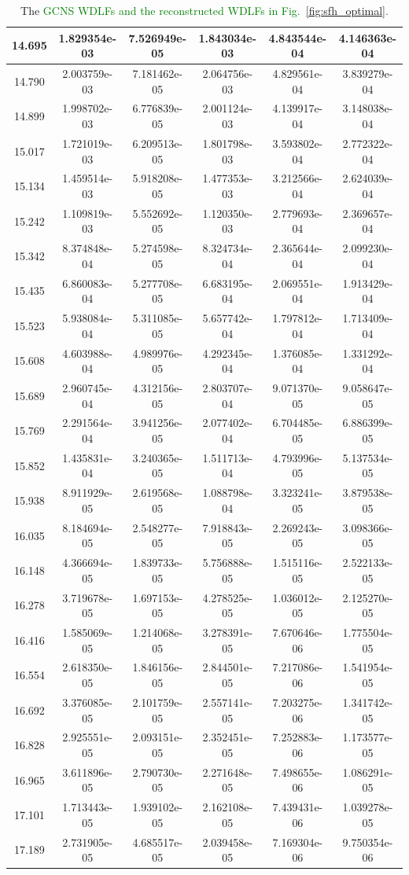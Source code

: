 \documentclass[fleqn,usenatbib]{mnras}
\begin{document}
\begin{table}
\begin{tabular}{c|cc|ccc}
14.695 & 1.829354e-03 & 7.526949e-05 & 1.843034e-03 & 4.843544e-04 & 4.146363e-04 \\ \hline
14.790 & 2.003759e-03 & 7.181462e-05 & 2.064756e-03 & 4.829561e-04 & 3.839279e-04 \\
14.899 & 1.998702e-03 & 6.776839e-05 & 2.001124e-03 & 4.139917e-04 & 3.148038e-04 \\
15.017 & 1.721019e-03 & 6.209513e-05 & 1.801798e-03 & 3.593802e-04 & 2.772322e-04 \\
15.134 & 1.459514e-03 & 5.918208e-05 & 1.477353e-03 & 3.212566e-04 & 2.624039e-04 \\
15.242 & 1.109819e-03 & 5.552692e-05 & 1.120350e-03 & 2.779693e-04 & 2.369657e-04 \\ \hline
15.342 & 8.374848e-04 & 5.274598e-05 & 8.324734e-04 & 2.365644e-04 & 2.099230e-04 \\
15.435 & 6.860083e-04 & 5.277708e-05 & 6.683195e-04 & 2.069551e-04 & 1.913429e-04 \\
15.523 & 5.938084e-04 & 5.311085e-05 & 5.657742e-04 & 1.797812e-04 & 1.713409e-04 \\
15.608 & 4.603988e-04 & 4.989976e-05 & 4.292345e-04 & 1.376085e-04 & 1.331292e-04 \\
15.689 & 2.960745e-04 & 4.312156e-05 & 2.803707e-04 & 9.071370e-05 & 9.058647e-05 \\ \hline
15.769 & 2.291564e-04 & 3.941256e-05 & 2.077402e-04 & 6.704485e-05 & 6.886399e-05 \\
15.852 & 1.435831e-04 & 3.240365e-05 & 1.511713e-04 & 4.793996e-05 & 5.137534e-05 \\
15.938 & 8.911929e-05 & 2.619568e-05 & 1.088798e-04 & 3.323241e-05 & 3.879538e-05 \\
16.035 & 8.184694e-05 & 2.548277e-05 & 7.918843e-05 & 2.269243e-05 & 3.098366e-05 \\
16.148 & 4.366694e-05 & 1.839733e-05 & 5.756888e-05 & 1.515116e-05 & 2.522133e-05 \\
16.278 & 3.719678e-05 & 1.697153e-05 & 4.278525e-05 & 1.036012e-05 & 2.125270e-05 \\ \hline
16.416 & 1.585069e-05 & 1.214068e-05 & 3.278391e-05 & 7.670646e-06 & 1.775504e-05 \\
16.554 & 2.618350e-05 & 1.846156e-05 & 2.844501e-05 & 7.217086e-06 & 1.541954e-05 \\
16.692 & 3.376085e-05 & 2.101759e-05 & 2.557141e-05 & 7.203275e-06 & 1.341742e-05 \\
16.828 & 2.925551e-05 & 2.093151e-05 & 2.352451e-05 & 7.252883e-06 & 1.173577e-05 \\
16.965 & 3.611896e-05 & 2.790730e-05 & 2.271648e-05 & 7.498655e-06 & 1.086291e-05 \\ \hline
17.101 & 1.713443e-05 & 1.939102e-05 & 2.162108e-05 & 7.439431e-06 & 1.039278e-05 \\
17.189 & 2.731905e-05 & 4.685517e-05 & 2.039458e-05 & 7.169304e-06 & 9.750354e-06
    \end{tabular}
    \caption{The \textcolor{green}{GCNS WDLFs and the reconstructed WDLFs in
    Fig.~\ref{fig:sfh_optimal}.}}
    \label{tab:reconstructed_wdlf}
\end{table}
\end{document}
